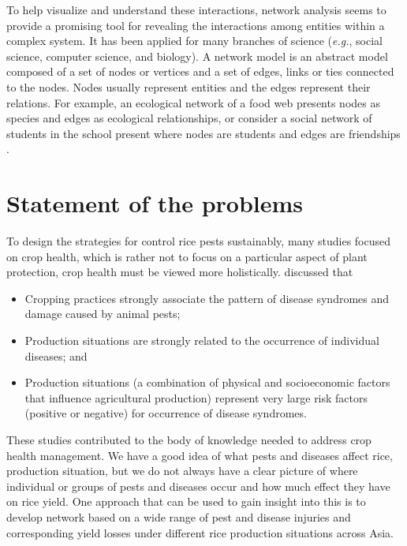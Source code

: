 To help visualize and understand these interactions, network analysis seems to provide a promising tool for revealing the interactions among entities within a complex system. It has been applied for many branches of science (\textit{e.g.}, social science, computer science, and biology). A network model is an abstract model composed of a set of nodes or vertices and a set of edges, links or ties connected to the nodes. Nodes usually represent entities and the edges represent their relations. For example, an ecological network of a food web presents nodes as species \citep{krause2003compartments} and edges as ecological relationships, or consider a social network of students in the school present where nodes are students and edges are friendships \citep{moody2001race}.

\newpage
\section*{Statement of the problems}

To design the strategies for control rice pests sustainably, many studies focused on crop health, which is rather not to focus on a particular aspect of plant protection, crop health must be viewed more holistically. \cite{savary1995use, Savary:2000vr, savary2005multiple} discussed that
\begin{itemize}
\item Cropping practices strongly associate the pattern of disease syndromes and damage caused by animal pests;
\item Production situations are strongly related to the occurrence of  individual diseases; and
\item Production situations (a combination of physical and socioeconomic factors that influence agricultural production) represent very large risk factors (positive or negative) for occurrence of disease syndromes. 


\end{itemize}
 
These studies contributed to the body of knowledge needed to address crop health management. We have a good idea of what pests and diseases affect rice, production situation, but we do not always have a clear picture of where individual or groups of pests and diseases occur and how much effect they have on rice yield. One approach that can be used to gain insight into this is to develop network based on a wide range of pest and disease injuries and corresponding yield losses under different rice production situations across Asia. 
\newpage
